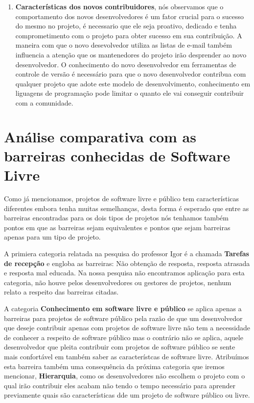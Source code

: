 \begin{enumerate}
\item \textbf{Características dos novos contribuidores}, nós observamos que o comportamento 
dos novos desenvolvedores é um fator crucial para o sucesso do mesmo no projeto, é necessario
que ele seja proativo, dedicado e tenha comprometimento com o projeto para obter sucesso
em sua contribuição. A maneira com que o novo desevolvedor utiliza as listas de e-mail
também influencia a atenção que os mantenedores do projeto irão desprender ao novo
desenvolvedor. O conhecimento do novo desenvolvedor em ferramentas de controle de versão
é necessário para que o novo desenvolvedor contribua com qualquer projeto que adote este
modelo de desenvolvimento, conhecimento em liguagens de programação pode limitar o quanto ele 
vai conseguir contribuir com a comunidade.

\end{enumerate}

\section{Análise comparativa com as barreiras conhecidas de Software Livre}

Como já mencionamos, projetos de software livre e público tem características 
diferentes embora tenha muitas semelhanças, desta forma é esperado que entre as
barreiras encontradas para os dois tipos de projetos nós tenhamos também pontos 
em que as barreiras sejam equivalentes e pontos que sejam barreiras apenas para
um tipo de projeto.

A primiera categoria relatada na pesquisa do professor Igor é a chamada \textbf{Tarefas
de recepção} e engloba as barreiras: Não obtenção de resposta, resposta atrasada e
resposta mal educada. Na nossa pesquisa não encontramos aplicação para esta categoria,
não houve pelos desenvolvedores ou gestores de projetos, nenhum relato a respeito das 
barreiras citadas.

A categoria \textbf{Conhecimento em software livre e público} se aplica apenas a
barreiras para projetos de software público pela razão de que um desenvolvedor 
que deseje contribuir apenas com projetos de software livre não tem a necessidade 
de conhecer a respeito de software público mas o contrário não se aplica, aquele 
desenvolvedor que pleita contribuir com projetos de software público se sente
mais confortável em também saber as característcas de software livre. Atribuímos
esta barreira também uma consequência da próxima categoria que iremos mencionar, 
\textbf{Hierarquia}, como os desenvolvedores não escolhem o projeto com o qual irão
contribuir eles acabam não tendo o tempo necessário para aprender previamente quais
são características dde um projeto de software público ou livre.

